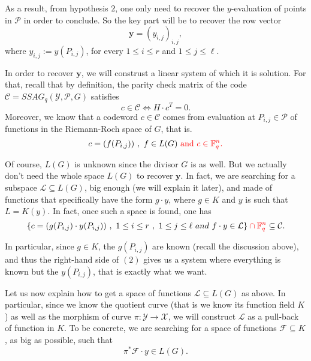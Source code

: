 \documentclass[10pt]{article}
\newcommand{\s}{\vspace{0.3cm}}
\newcommand{\cd}{\cdot}
\newcommand{\fq}{\mathbb{F}_q}
\newcommand{\su}{\subseteq}
\newcommand{\X}{\mathcal{X}}
\newcommand{\Y}{\mathcal{Y}}
\newcommand{\PR}{\mathcal{P}}
\begin{document}
As a result, from hypothesis $2$, one only need to recover the $y$-evaluation of points in $\PR$ in order to conclude. So the key part will be to recover the row vector
\begin{equation}
\textbf{y} = (y_{i,j})_{i,j},
\end{equation}
where $y_{i,j} := y(P_{i,j})$, for every $1 \leq i \leq r$ and $1 \leq j \leq \ell$.

\s

In order to recover $\mathbf{y}$, we will construst a linear system of which it is solution. For that, recall that by definition, the parity check matrix of the code $\mathcal{C}=SSAG_q(\Y,\PR,G)$ satisfies
\begin{equation}
c \in \mathcal{C} \iff H \cd c^T = 0.
\end{equation}
Moreover, we know that a codeword $c \in \mathcal{C}$ comes from evaluation at $P_{i,j} \in \PR$ of functions in the Riemann-Roch space of $G$, that is.
\[c = (f(P_{i,j})) \ , \ f \in L(G) \ \color{red}\textrm{and} \ c \in \fq^n. \color{black}\]

Of course, $L(G)$ is unknown since the divisor $G$ is as well. But we actually don't need the whole space $L(G)$ to recover $\mathbf{y}$. In fact, we are searching for a subspace $\mathcal{L} \su L(G)$, big enough (we will explain it later), and made of functions that specifically have the form $g \cd y$, where $g \in K$ and $y$ is such that $L=K(y)$. In fact, once such a space is found, one has 
\[\{c= (g(P_{i,j}) \cd y(P_{i,j})) \ , \ 1 \leq i \leq r \ , \ 1 \leq j \leq \ell \ and \ f\cd y \in \mathcal{L}\} \color{red} \cap \fq^n \color{black} \su \mathcal{C}.\] 

In particular, since $g \in K$, the $g(P_{i,j})$ are known (recall the discussion above), and thus the right-hand side of $(2)$ gives us a system where everything is known but the $y(P_{i,j})$, that is exactly what we want.

\s

Let us now explain how to get a space of functions $\mathcal{L} \su L(G)$ as above. In particular, since we know the quotient curve (that is we know its function field $K$) as well as the morphism of curve $\pi : \Y \rightarrow \X$, we will construct $\mathcal{L}$ as a pull-back of function in $K$. To be concrete, we are searching for a space of functions $\mathcal{F} \su K$, as big as possible, such that 
\begin{equation}
\pi^*\mathcal{F} \cd y \in L(G). 
\end{equation}
\end{document}
